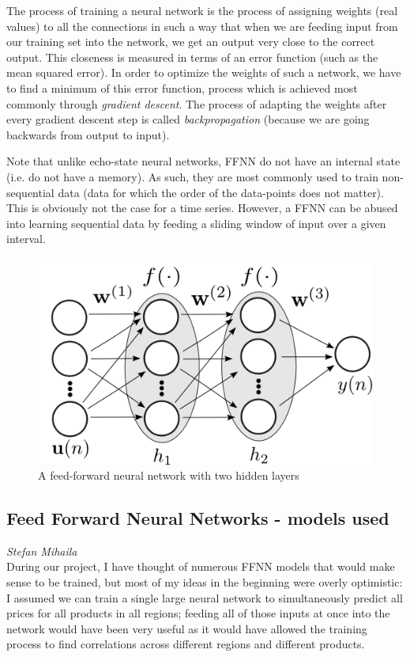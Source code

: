 The process of training a neural network is the process of assigning weights
(real values) to all the connections in such a way that when we are feeding
input from our training set into the network, we get an output very close to
the correct output. This closeness is measured in terms of an error function
(such as the mean squared error). In order to optimize the weights of such a
network, we have to find a minimum of this error function, process which is
achieved most commonly through \emph{gradient descent}. The process of adapting
the weights after every gradient descent step is called \emph{backpropagation}
(because we are going backwards from output to input).

Note that unlike echo-state neural networks, FFNN do not have an internal state
(i.e. do not have a memory). As such, they are most commonly used to train
non-sequential data (data for which the order of the data-points does not matter).
This is obviously not the case for a time series.  However, a FFNN can be
abused into learning sequential data by feeding a sliding window of input over
a given interval.

\begin{figure}
    \centering
    \includegraphics[width=.7\textwidth]{img/ffnn_prezi.png}
    \caption{A feed-forward neural network with two hidden layers}
\end{figure}

\subsection*{Feed Forward Neural Networks - models used}
\emph{Stefan Mihaila}\\
During our project, I have thought of numerous FFNN models that would make
sense to be trained, but most of my ideas in the beginning were overly
optimistic: I assumed we can train a single large neural network to
simultaneously predict all prices for all products in all regions; feeding all
of those inputs at once into the network would have been very useful as it
would have allowed the training process to find correlations across different
regions and different products.

